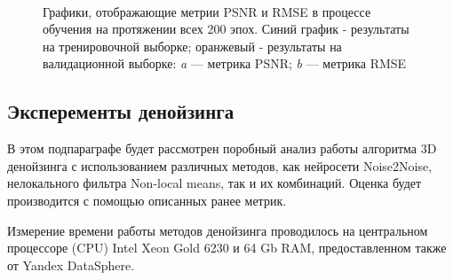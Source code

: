 \begin{figure}[H]
\begin{subfigure}[t]{\dimexpr.5\linewidth-1.3em\relax}
	\end{subfigure}
	\\[20pt]
	\captionsetup{justification=centering} %
	\caption{Графики, отображающие метрии PSNR и RMSE в процессе обучения на протяжении всех 200 эпох. Синий график - результаты на тренировочной выборке; оранжевый - результаты на валидационной выборке: {\itshape a} --- метрика PSNR; {\itshape b} --- метрика RMSE} 
	\label{fig:denoising-training-metrics}
\end{figure}

\subsection{Эксперементы денойзинга}
\par В этом подпараграфе будет рассмотрен поробный анализ работы алгоритма 3D денойзинга с использованием различных методов, как нейросети Noise2Noise, нелокального фильтра Non-local means, так и их комбинаций. Оценка будет производится с помощью описанных ранее метрик. 
\par Измерение времени работы методов денойзинга проводилось на центральном процессоре (CPU) Intel Xeon Gold 6230 и 64 Gb RAM, предоставленном также от Yandex DataSphere. 
